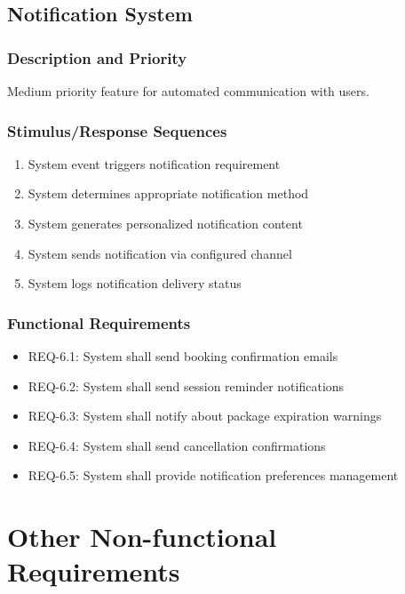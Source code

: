 \documentclass[12pt,a4paper]{article}
\begin{document}
\subsection{Notification System}
\subsubsection{Description and Priority}
Medium priority feature for automated communication with users.

\subsubsection{Stimulus/Response Sequences}
\begin{enumerate}
    \item System event triggers notification requirement
    \item System determines appropriate notification method
    \item System generates personalized notification content
    \item System sends notification via configured channel
    \item System logs notification delivery status
\end{enumerate}

\subsubsection{Functional Requirements}
\begin{itemize}
    \item REQ-6.1: System shall send booking confirmation emails
    \item REQ-6.2: System shall send session reminder notifications
    \item REQ-6.3: System shall notify about package expiration warnings
    \item REQ-6.4: System shall send cancellation confirmations
    \item REQ-6.5: System shall provide notification preferences management
\end{itemize}

\section{Other Non-functional Requirements}
\end{document}
